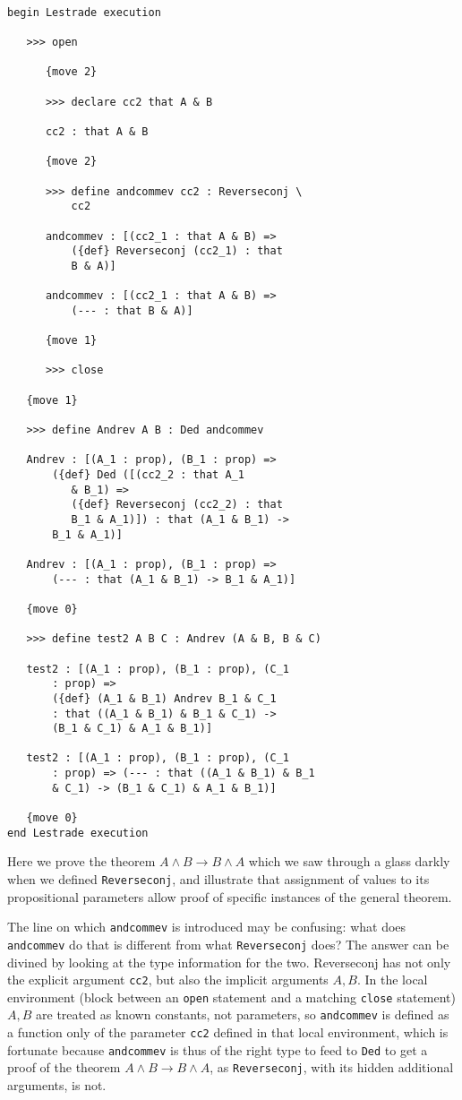\documentclass[12pt]{article}
\begin{document}
\begin{verbatim}

begin Lestrade execution

   >>> open

      {move 2}

      >>> declare cc2 that A & B

      cc2 : that A & B

      {move 2}

      >>> define andcommev cc2 : Reverseconj \
          cc2

      andcommev : [(cc2_1 : that A & B) => 
          ({def} Reverseconj (cc2_1) : that 
          B & A)]

      andcommev : [(cc2_1 : that A & B) => 
          (--- : that B & A)]

      {move 1}

      >>> close

   {move 1}

   >>> define Andrev A B : Ded andcommev

   Andrev : [(A_1 : prop), (B_1 : prop) => 
       ({def} Ded ([(cc2_2 : that A_1 
          & B_1) => 
          ({def} Reverseconj (cc2_2) : that 
          B_1 & A_1)]) : that (A_1 & B_1) -> 
       B_1 & A_1)]

   Andrev : [(A_1 : prop), (B_1 : prop) => 
       (--- : that (A_1 & B_1) -> B_1 & A_1)]

   {move 0}

   >>> define test2 A B C : Andrev (A & B, B & C)

   test2 : [(A_1 : prop), (B_1 : prop), (C_1 
       : prop) => 
       ({def} (A_1 & B_1) Andrev B_1 & C_1 
       : that ((A_1 & B_1) & B_1 & C_1) -> 
       (B_1 & C_1) & A_1 & B_1)]

   test2 : [(A_1 : prop), (B_1 : prop), (C_1 
       : prop) => (--- : that ((A_1 & B_1) & B_1 
       & C_1) -> (B_1 & C_1) & A_1 & B_1)]

   {move 0}
end Lestrade execution

\end{verbatim}

Here we prove the theorem $A \wedge B \rightarrow B \wedge A$ which we saw through a glass darkly when we defined {\tt Reverseconj}, and illustrate that assignment of values to its propositional parameters allow proof of specific instances of the general theorem.

The line on which {\tt andcommev} is introduced may be confusing:  what does {\tt andcommev} do that is different from what {\tt Reverseconj} does?  The answer can be divined by looking at the type information for the two.  Reverseconj has not only the explicit argument {\tt cc2}, but also the implicit arguments $A,B$.  In the local environment (block between an {\tt open} statement and a matching {\tt close} statement) $A,B$ are treated as known constants, not parameters, so {\tt andcommev} is defined as a function only of the parameter {\tt cc2} defined
in that local environment, which is fortunate because {\tt andcommev} is thus of the right type to feed to {\tt Ded}
to get a proof of the theorem $A \wedge B \rightarrow B \wedge A$, as {\tt Reverseconj}, with its hidden additional arguments, is not.
\end{document}
